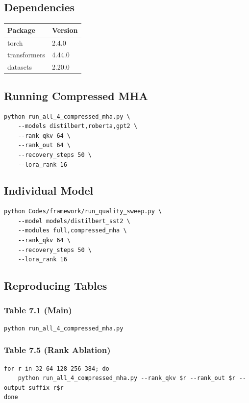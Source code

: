 \subsection{Dependencies}

\begin{table}[H]
\centering
\small
\begin{tabular}{ll}
\toprule
\textbf{Package} & \textbf{Version} \\
\midrule
torch & 2.4.0 \\
transformers & 4.44.0 \\
datasets & 2.20.0 \\
\bottomrule
\end{tabular}
\end{table}

\subsection{Running Compressed MHA}

\begin{lstlisting}
python run_all_4_compressed_mha.py \
    --models distilbert,roberta,gpt2 \
    --rank_qkv 64 \
    --rank_out 64 \
    --recovery_steps 50 \
    --lora_rank 16
\end{lstlisting}

\subsection{Individual Model}

\begin{lstlisting}
python Codes/framework/run_quality_sweep.py \
    --model models/distilbert_sst2 \
    --modules full,compressed_mha \
    --rank_qkv 64 \
    --recovery_steps 50 \
    --lora_rank 16
\end{lstlisting}

\subsection{Reproducing Tables}

\subsubsection{Table 7.1 (Main)}
\begin{lstlisting}
python run_all_4_compressed_mha.py
\end{lstlisting}

\subsubsection{Table 7.5 (Rank Ablation)}
\begin{lstlisting}
for r in 32 64 128 256 384; do
    python run_all_4_compressed_mha.py --rank_qkv $r --rank_out $r --output_suffix r$r
done
\end{lstlisting}


